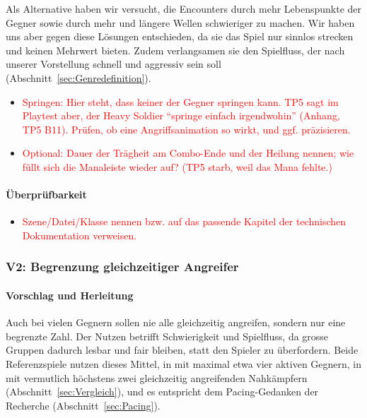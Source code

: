 \documentclass[../Main.tex]{subfiles}
\begin{document}
Als Alternative haben wir versucht, die Encounters durch mehr Lebenspunkte der Gegner sowie durch mehr und längere Wellen schwieriger zu machen. Wir haben uns aber gegen diese Lösungen entschieden, da sie das Spiel nur sinnlos strecken und keinen Mehrwert bieten. Zudem verlangsamen sie den Spielfluss, der nach unserer Vorstellung schnell und aggressiv sein soll (Abschnitt~\ref{sec:Genredefinition}).

\begin{itemize}[leftmargin=1.5cm]
    \item \textcolor{red}{Springen: Hier steht, dass keiner der Gegner springen kann. TP5 sagt im Playtest aber, der Heavy Soldier \enquote{springe einfach irgendwohin} (Anhang, TP5 B11). Prüfen, ob eine Angriffsanimation so wirkt, und ggf. präzisieren.}
    \item \textcolor{red}{Optional: Dauer der Trägheit am Combo-Ende und der Heilung nennen; wie füllt sich die Manaleiste wieder auf? (TP5 starb, weil das Mana fehlte.)}
\end{itemize}

\paragraph{Überprüfbarkeit}
\begin{itemize}[leftmargin=1.5cm]
    \item \textcolor{red}{Szene/Datei/Klasse nennen bzw. auf das passende Kapitel der technischen Dokumentation verweisen.}
\end{itemize}

\subsubsection{V2: Begrenzung gleichzeitiger Angreifer} \label{sec:V2}

\paragraph{Vorschlag und Herleitung}
Auch bei vielen Gegnern sollen nie alle gleichzeitig angreifen, sondern nur eine begrenzte Zahl. Der Nutzen betrifft Schwierigkeit und Spielfluss, da grosse Gruppen dadurch lesbar und fair bleiben, statt den Spieler zu überfordern. Beide Referenzspiele nutzen dieses Mittel, in  mit maximal etwa vier aktiven Gegnern, in  mit vermutlich höchstens zwei gleichzeitig angreifenden Nahkämpfern (Abschnitt~\ref{sec:Vergleich}), und es entspricht dem Pacing-Gedanken der Recherche (Abschnitt~\ref{sec:Pacing}).
\end{document}
